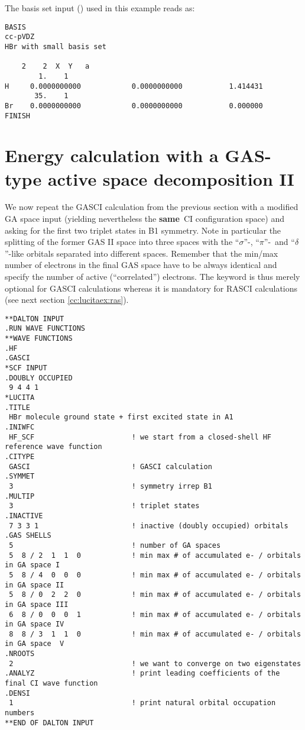 The basis set input (\molinp) used in this example reads as:

\begin{verbatim}
BASIS
cc-pVDZ
HBr with small basis set

    2    2  X  Y   a
        1.    1
H     0.0000000000            0.0000000000           1.414431
       35.    1
Br    0.0000000000            0.0000000000           0.000000
FINISH
\end{verbatim}

\section{Energy calculation with a GAS-type active space decomposition II}\label{cc:lucitaex:gas2}

We now repeat the GASCI calculation from the previous section 
with a modified GA space input (yielding nevertheless the {\bf{same}}\ CI configuration space) 
and asking for the first two triplet states in B1 symmetry. 
Note in particular the splitting of the former GAS II space into three 
spaces with the ``$\sigma$''-, ``$\pi$''-\ and ``$\delta$''-like orbitals separated into different spaces. 
Remember that the min/max number of electrons in the final GAS space have to be always identical and 
specify the number of active (``correlated'') electrons. The keyword  is thus merely optional for 
GASCI calculations whereas it is mandatory for RASCI calculations (see next section \ref{cc:lucitaex:ras}). 

%
\begin{verbatim}
**DALTON INPUT
.RUN WAVE FUNCTIONS
**WAVE FUNCTIONS
.HF
.GASCI
*SCF INPUT
.DOUBLY OCCUPIED
 9 4 4 1
*LUCITA
.TITLE
 HBr molecule ground state + first excited state in A1
.INIWFC
 HF_SCF                       ! we start from a closed-shell HF reference wave function
.CITYPE
 GASCI                        ! GASCI calculation
.SYMMET
 3                            ! symmetry irrep B1
.MULTIP
 3                            ! triplet states
.INACTIVE
 7 3 3 1                      ! inactive (doubly occupied) orbitals
.GAS SHELLS
 5                            ! number of GA spaces
 5  8 / 2  1  1  0            ! min max # of accumulated e- / orbitals in GA space I
 5  8 / 4  0  0  0            ! min max # of accumulated e- / orbitals in GA space II
 5  8 / 0  2  2  0            ! min max # of accumulated e- / orbitals in GA space III
 6  8 / 0  0  0  1            ! min max # of accumulated e- / orbitals in GA space IV
 8  8 / 3  1  1  0            ! min max # of accumulated e- / orbitals in GA space  V
.NROOTS
 2                            ! we want to converge on two eigenstates
.ANALYZ                       ! print leading coefficients of the final CI wave function
.DENSI
 1                            ! print natural orbital occupation numbers
**END OF DALTON INPUT
\end{verbatim}

